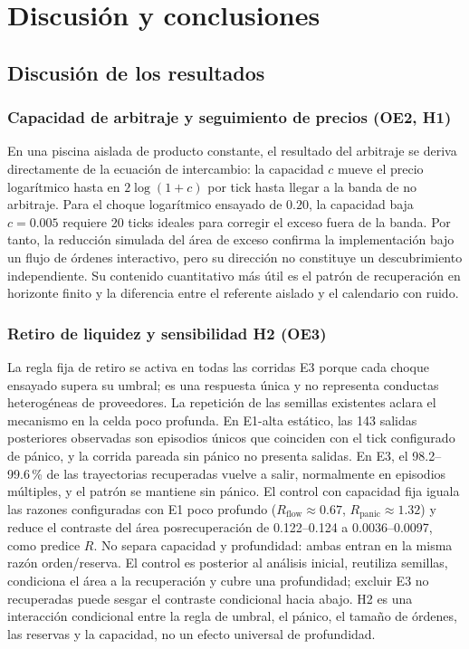 \chapter{Discusión y conclusiones}
\label{cap:discusion}

\section{Discusión de los resultados}

\subsection{Capacidad de arbitraje y seguimiento de precios (OE2, H1)}

En una piscina aislada de producto constante, el resultado del arbitraje se deriva directamente de la ecuación de intercambio: la capacidad $c$ mueve el precio logarítmico hasta en $2\log(1+c)$ por tick hasta llegar a la banda de no arbitraje. Para el choque logarítmico ensayado de $0.20$, la capacidad baja $c=0.005$ requiere 20 ticks ideales para corregir el exceso fuera de la banda. Por tanto, la reducción simulada del área de exceso confirma la implementación bajo un flujo de órdenes interactivo, pero su dirección no constituye un descubrimiento independiente. Su contenido cuantitativo más útil es el patrón de recuperación en horizonte finito y la diferencia entre el referente aislado y el calendario con ruido.

\subsection{Retiro de liquidez y sensibilidad H2 (OE3)}

La regla fija de retiro se activa en todas las corridas E3 porque cada choque ensayado supera su umbral; es una respuesta única y no representa conductas heterogéneas de proveedores. La repetición de las semillas existentes aclara el mecanismo en la celda poco profunda. En E1-alta estático, las 143 salidas posteriores observadas son episodios únicos que coinciden con el tick configurado de pánico, y la corrida pareada sin pánico no presenta salidas. En E3, el 98.2--99.6\,\% de las trayectorias recuperadas vuelve a salir, normalmente en episodios múltiples, y el patrón se mantiene sin pánico. El control con capacidad fija iguala las razones configuradas con E1 poco profundo ($R_{\mathrm{flow}}\approx0.67$, $R_{\mathrm{panic}}\approx1.32$) y reduce el contraste del área posrecuperación de 0.122--0.124 a 0.0036--0.0097, como predice $R$. No separa capacidad y profundidad: ambas entran en la misma razón orden/reserva. El control es posterior al análisis inicial, reutiliza semillas, condiciona el área a la recuperación y cubre una profundidad; excluir E3 no recuperadas puede sesgar el contraste condicional hacia abajo. H2 es una interacción condicional entre la regla de umbral, el pánico, el tamaño de órdenes, las reservas y la capacidad, no un efecto universal de profundidad.

